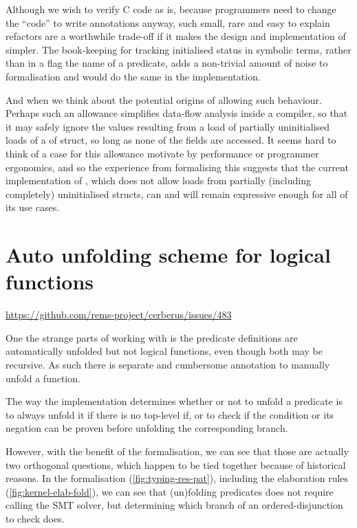 Although we wish to verify C code as is, because programmers need to change the
``code'' to write annotations anyway, such small, rare and easy to explain
refactors are a worthwhile trade-off if it makes the design and implementation
of  simpler. The book-keeping for tracking initialised status in
symbolic terms, rather than in a flag the name of a predicate, adds a
non-trivial amount of noise to formalisation and would do the same in the
implementation.

And when we think about the potential origins of allowing such behaviour.
Perhaps such an allowance simplifies data-flow analysis inside a compiler, so
that it may safely ignore the values resulting from a load of partially
uninitialised loads of a of struct, so long as none of the fields are accessed.
It seems hard to think of a case for this allowance motivate by performance or
programmer ergonomics, and so the experience from formalising this suggests
that the current implementation of , which does not allow loads from
partially (including completely) uninitialised structs, can and will remain
expressive enough for all of its use cases.

\section{Auto unfolding scheme for logical functions}\label{sec:auto-unfold-functions}

\url{https://github.com/rems-project/cerberus/issues/483}

One the strange parts of working with  is the predicate definitions are
automatically unfolded but not logical functions, even though both may be
recursive. As such there is separate and cumbersome annotation to manually
unfold a function.

The way the implementation determines whether or not to unfold a predicate is
to always unfold it if there is no top-level if, or to check if the condition
or its negation can be proven before unfolding the corresponding branch.

However, with the benefit of the formalisation, we can see that those are
actually two orthogonal questions, which happen to be tied together because of
historical reasons. In the formalisation (\cref{fig:typing-res-pat}), including
the elaboration rules (\cref{fig:kernel-elab-fold}),  we can see that (un)folding %
predicates does not require calling the SMT solver, but determining which
branch of an ordered-disjunction to check does.


